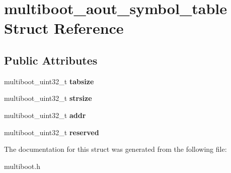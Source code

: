 \hypertarget{structmultiboot__aout__symbol__table}{}\section{multiboot\+\_\+aout\+\_\+symbol\+\_\+table Struct Reference}
\label{structmultiboot__aout__symbol__table}
\subsection*{Public Attributes}
\begin{DoxyCompactItemize}
\item 
\mbox{\label{structmultiboot__aout__symbol__table_a3c9cc58c068678c095a7695f74375ca2}} 
multiboot\+\_\+uint32\+\_\+t {\bfseries tabsize}
\item 
\mbox{\label{structmultiboot__aout__symbol__table_af9876cbe1b37935ed039c855f04b760e}} 
multiboot\+\_\+uint32\+\_\+t {\bfseries strsize}
\item 
\mbox{\label{structmultiboot__aout__symbol__table_ab399f68a251079409489149a5d48033f}} 
multiboot\+\_\+uint32\+\_\+t {\bfseries addr}
\item 
\mbox{\label{structmultiboot__aout__symbol__table_a2317e4e566e417b8fb3502074e0807d7}} 
multiboot\+\_\+uint32\+\_\+t {\bfseries reserved}
\end{DoxyCompactItemize}


The documentation for this struct was generated from the following file\+:\begin{DoxyCompactItemize}
\item 
multiboot.\+h\end{DoxyCompactItemize}
